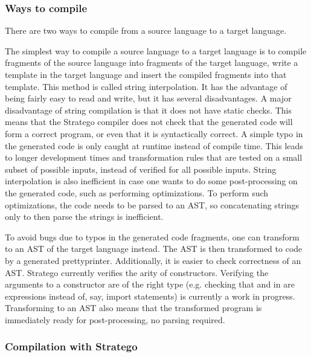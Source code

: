 \subsubsection{Ways to compile}
\label{subsubsec:problem_analysis__background__ways_to_compile}

There are two ways to compile from a source language to a target language.

The simplest way to compile a source language to a target language is to compile fragments of the source language into fragments of the target language, write a template in the target language and insert the compiled fragments into that template.
This method is called string interpolation.
It has the advantage of being fairly easy to read and write, but it has several disadvantages.
A major disadvantage of string compilation is that it does not have static checks.
This means that the Stratego compiler  does not check that the generated code will form a correct program, or even that it is syntactically correct.
A simple typo in the generated code is only caught at runtime instead of compile time.
This leads to longer development times and transformation rules that are tested on a small subset of possible inputs, instead of verified for all possible inputs.
String interpolation is also inefficient in case one wants to do some post-processing on the generated code, such as performing optimizations.
To perform such optimizations, the code needs to be parsed to an AST, so concatenating strings only to then parse the strings is inefficient.

To avoid bugs due to typos in the generated code fragments, one can transform to an AST of the target language instead.
The AST is then transformed to code by a generated prettyprinter.
Additionally, it is easier to check correctness of an AST.
Stratego currently verifies the arity of constructors.
Verifying the arguments to a constructor are of the right type (e.g. checking that  and  in  are expressions instead of, say, import statements) is currently a work in progress.
Transforming to an AST also means that the transformed program is immediately ready for post-processing, no parsing required.

\subsubsection{Compilation with Stratego}
\label{subsubsec:problem_analysis__background__stratego}

